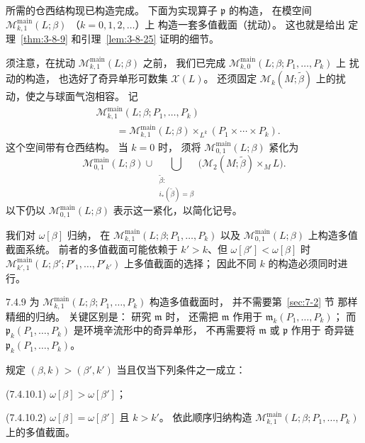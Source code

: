 
所需的仓西结构现已构造完成。
下面为实现算子 $\mathfrak p$ 的构造，
在模空间
$\mathcal M^{\mathrm{main}}_{k,1}(L;\beta)$
（$k=0,1,2,\ldots$）上
构造一套多值截面（扰动）。
这也就是给出
定理~\ref{thm:3-8-9}
和引理~\ref{lem:3-8-25}
证明的细节。

须注意，在扰动
$\mathcal M^{\mathrm{main}}_{k,1}(L;\beta)$
之前，
我们已完成
$\mathcal M^{\mathrm{main}}_{k,0}
(L;\beta;P_1,\ldots,P_k)$ 上
扰动的构造，
也选好了奇异单形可数集 $\mathcal X(L)$。
还须固定
$\mathcal M_k(M;\widetilde\beta)$
上的扰动，使之与球面气泡相容。
记
\begin{equation}
\begin{aligned}
&\mathcal M^{\mathrm{main}}_{k,1}
(L;\beta;P_1,\ldots,P_k)\\
&\qquad=
\mathcal M^{\mathrm{main}}_{k,1}(L;\beta)
\times_{L^k}(P_1\times\cdots\times P_k).
\end{aligned}
\tag{7.4.7}\label{eq:7-4-7}
\end{equation}
这个空间带有仓西结构。
当 $k=0$ 时，
须将 $\mathcal M^{\mathrm{main}}_{0,1}(L;\beta)$
紧化为
\begin{equation}
\mathcal M^{\mathrm{main}}_{0,1}(L;\beta)
\cup
\bigcup_{\substack{\widetilde\beta:\\
i_*(\widetilde\beta)=\beta}}
\bigl(\mathcal M_2(M;\widetilde\beta)
\times_M L\bigr).
\tag{7.4.8}\label{eq:7-4-8}
\end{equation}
以下仍以
$\mathcal M^{\mathrm{main}}_{0,1}(L;\beta)$
表示这一紧化，以简化记号。

我们对 $\omega[\beta]$ 归纳，
在
$\mathcal M^{\mathrm{main}}_{k,1}
(L;\beta;P_1,\ldots,P_k)$
以及
$\mathcal M^{\mathrm{main}}_{0,1}(L;\beta)$
上构造多值截面系统。
前者的多值截面可能依赖于
$k'>k$、但 $\omega[\beta']<\omega[\beta]$
时
$\mathcal M^{\mathrm{main}}_{k',1}
(L;\beta';P'_1,\ldots,P'_{k'})$
上多值截面的选择；
因此不同 $k$ 的构造必须同时进行。

\begin{remark}{7.4.9}\label{rem:7-4-9}
为
$\mathcal M^{\mathrm{main}}_{k,1}
(L;\beta;P_1,\ldots,P_k)$
构造多值截面时，
并不需要第~\ref{sec:7-2} 节
那样精细的归纳。
关键区别是：
研究 $\mathfrak m$ 时，
还需把 $\mathfrak m$ 作用于
$\mathfrak m_k(P_1,\ldots,P_k)$；
而 $\mathfrak p_k(P_1,\ldots,P_k)$
是环境辛流形中的奇异单形，
不再需要将 $\mathfrak m$ 或
$\mathfrak p$ 作用于
奇异链 $\mathfrak p_k(P_1,\ldots,P_k)$。
\end{remark}

规定 $(\beta,k)>(\beta',k')$
当且仅当下列条件之一成立：
\par\noindent\textup{(7.4.10.1)}\label{cond:7-4-10-1}\quad
$\omega[\beta]>\omega[\beta']$；
\par\noindent\textup{(7.4.10.2)}\label{cond:7-4-10-2}\quad
$\omega[\beta]=\omega[\beta']$ 且 $k>k'$。
依此顺序归纳构造
$\mathcal M^{\mathrm{main}}_{k,1}
(L;\beta;P_1,\ldots,P_k)$
上的多值截面。

